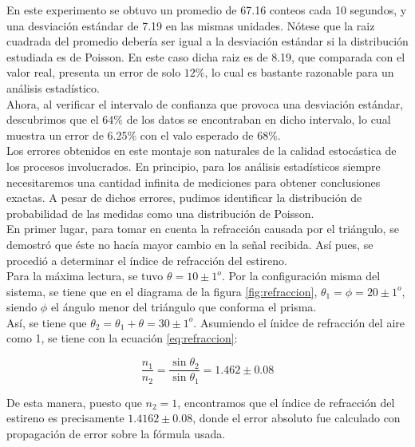 \documentclass[%
 reprint,
 amsmath,amssymb,
 aps,
]{revtex4-1}
\begin{document}
En este experimento se obtuvo un promedio de 67.16 conteos cada 10 segundos, y una desviación estándar de    7.19 en las mismas unidades. Nótese que la raiz cuadrada del promedio debería ser igual a la desviación estándar si la distribución estudiada es de Poisson. En este caso dicha raiz es de 8.19, que comparada con el valor real, presenta un error de solo $12\%$, lo cual es bastante razonable para un análisis estadístico.\\

Ahora, al verificar el intervalo de confianza que provoca una desviación estándar, descubrimos que el $64\%$ de los datos se encontraban en dicho intervalo, lo cual muestra un error de 6.25\% con el valo esperado de $68\%$.\\

Los errores obtenidos en este montaje son naturales de la calidad estocástica de los procesos involucrados. En principio, para los análisis estadísticos siempre necesitaremos una cantidad infinita de mediciones para obtener conclusiones exactas. A pesar de dichos errores, pudimos identificar la distribución de probabilidad de las medidas como una distribución de Poisson.\\

En primer lugar, para tomar en cuenta la refracción causada por el triángulo, se demostró que éste no hacía mayor cambio en la señal recibida. Así pues, se procedió a determinar el índice de refracción del estireno. \\

Para la máxima lectura, se tuvo $ \theta = 10 \pm 1^o $. Por la configuración misma del sistema, se tiene que en el diagrama de la figura \ref{fig:refraccion}, $ \theta_1 = \phi = 20\pm1^o $, siendo $ \phi $ el ángulo menor del triángulo que conforma el prisma. \\

Así, se tiene que $ \theta_2 = \theta_1 + \theta = 30\pm1^o $. Asumiendo el ínidce de refracción del aire como 1, se tiene con la ecuación \ref{eq:refraccion}:

\begin{equation}
\frac{n_1}{n_2} = \frac{\sin{\theta_2}}{\sin{\theta_1}}= 1.462\pm0.08
\end{equation}

De esta manera, puesto que $ n_2 = 1 $, encontramos que el índice de refracción del estireno es precisamente $1.4162\pm0.08$, donde el error absoluto fue calculado con propagación de error sobre la fórmula usada. \\
\end{document}
